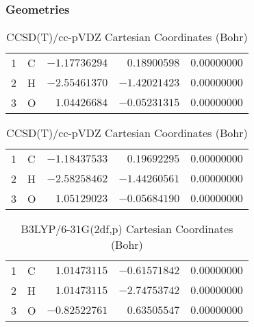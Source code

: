\documentclass[10pt,oneside]{article}
\begin{document}
\clearpage

\subsection{}

\begin{table}[h!]
\subsubsection*{Geometries}
\begin{multicols}{2}
\centering
\caption{CCSD(T)/cc-pVTZ Cartesian Coordinates (Bohr)}
\begin{tabular}{llrrr}
\toprule
1  & C  & $-1.17736294$ & $ 0.18900598$ & $ 0.00000000$ \\
2  & H  & $-2.55461370$ & $-1.42021423$ & $ 0.00000000$ \\
3  & O  & $ 1.04426684$ & $-0.05231315$ & $ 0.00000000$ \\
\bottomrule
\end{tabular}
\caption{CCSD(T)/cc-pVDZ Cartesian Coordinates (Bohr)}
\begin{tabular}{llrrr}
\toprule
1  & C  & $-1.18437533$ & $ 0.19692295$ & $ 0.00000000$ \\
2  & H  & $-2.58258462$ & $-1.44260561$ & $ 0.00000000$ \\
3  & O  & $ 1.05129023$ & $-0.05684190$ & $ 0.00000000$ \\
\bottomrule
\end{tabular}
\end{multicols}
\end{table}

\begin{table}[h]
\centering
\caption{B3LYP/6-31G(2df,p) Cartesian Coordinates (Bohr)}
\begin{tabular}{llrrr}
\toprule
1  & C  & $ 1.01473115$ & $-0.61571842$ & $ 0.00000000$ \\
2  & H  & $ 1.01473115$ & $-2.74753742$ & $ 0.00000000$ \\
3  & O  & $-0.82522761$ & $ 0.63505547$ & $ 0.00000000$ \\
\bottomrule
\end{tabular}
\end{table}
\end{document}
